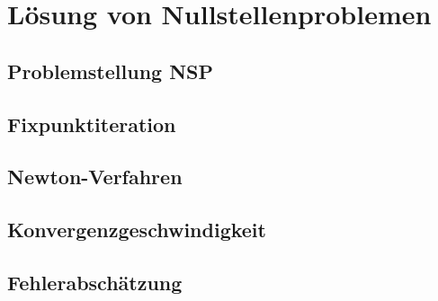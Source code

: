 \section{Lösung von Nullstellenproblemen}

\subsection{Problemstellung NSP}

\subsection{Fixpunktiteration}

\subsection{Newton-Verfahren}

\subsection{Konvergenzgeschwindigkeit}

\subsection{Fehlerabschätzung}